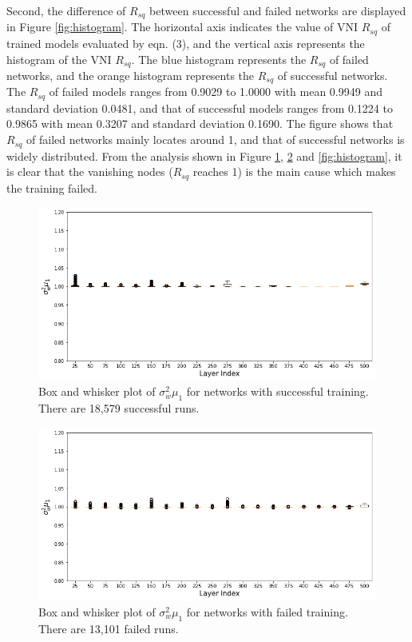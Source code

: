 Second, the difference of $R_{sq}$ between successful and failed networks are displayed in Figure \ref{fig:histogram}.
The horizontal axis indicates the value of VNI $R_{sq}$ of trained models evaluated by eqn. (3), and the vertical axis represents the histogram of the VNI $R_{sq}$.
The blue histogram represents the $R_{sq}$ of failed networks, and the orange histogram represents the $R_{sq}$ of successful networks.
The $R_{sq}$ of failed models ranges from 0.9029 to 1.0000 with mean 0.9949 and standard deviation 0.0481, and that of successful models ranges from 0.1224 to 0.9865 with mean 0.3207 and standard deviation 0.1690.
The figure shows that $R_{sq}$ of failed networks mainly locates around 1, and that of successful networks is widely distributed.
From the analysis shown in Figure \ref{fig:succ_box}, \ref{fig:fail_box} and \ref{fig:histogram}, it is clear that the vanishing nodes ($R_{sq}$ reaches 1) is the main cause which makes the training failed.

\begin{figure}[h]
    \centering
    \includegraphics[width=1.0\textwidth]{img/supp/SuccBox.png}
    \caption{Box and whisker plot of $\sigma_w^2\mu_1$ for networks with successful training. There are 18,579 successful runs.
    }
    \label{fig:succ_box}
\end{figure}

\begin{figure}[h]
    \centering
    \includegraphics[width=1.0\textwidth]{img/supp/FailBox.png}
    \caption{Box and whisker plot of $\sigma_w^2\mu_1$ for networks with failed training. There are 13,101 failed runs.
    }
    \label{fig:fail_box}
\end{figure}

